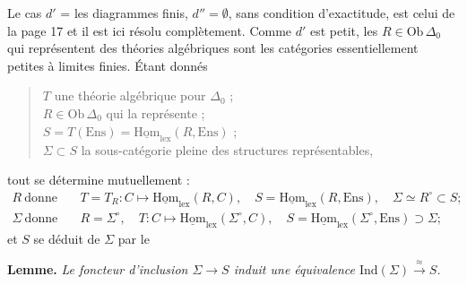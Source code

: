 \documentclass[11pt,a4paper]{article}
\begin{document}
Le cas $d'$ = les diagrammes finis, $d'' = \emptyset$, sans condition
d'exactitude, est celui de la page 17 et il est ici résolu complètement.
Comme $d'$ est petit, les $R \in \mathrm{Ob}\,\Delta_{0}$ qui représentent
des théories algébriques sont les catégories essentiellement petites à
limites finies. Étant donnés
\begin{quote}
$T$ une théorie algébrique pour $\Delta_{0}$ ; \\
$R \in \mathrm{Ob}\,\Delta_{0}$ qui la représente ; \\
$S = T(\mathrm{Ens}) = \underline{\mathrm{Hom}}_{\mathrm{lex}}(R, \mathrm{Ens})$ ; \\
$\Sigma \subset S$ la sous-catégorie pleine des structures représentables,
\end{quote}
tout se détermine mutuellement :
\begin{align*}
R \ \text{donne}\quad & T = T_{R} : C \mapsto \underline{\mathrm{Hom}}_{\mathrm{lex}}(R, C),
\quad S = \underline{\mathrm{Hom}}_{\mathrm{lex}}(R, \mathrm{Ens}),
\quad \Sigma \simeq R^{\circ} \subset S ; \\
\Sigma \ \text{donne}\quad & R = \Sigma^{\circ},
\quad T : C \mapsto \underline{\mathrm{Hom}}_{\mathrm{lex}}(\Sigma^{\circ}, C),
\quad S = \underline{\mathrm{Hom}}_{\mathrm{lex}}(\Sigma^{\circ}, \mathrm{Ens}) \supset \Sigma ;
\end{align*}
et $S$ se déduit de $\Sigma$ par le

\textbf{Lemme.} \emph{Le foncteur d'inclusion $\Sigma \to S$ induit une
équivalence $\mathrm{Ind}(\Sigma) \xrightarrow{\ \approx\ } S$.}
\end{document}
